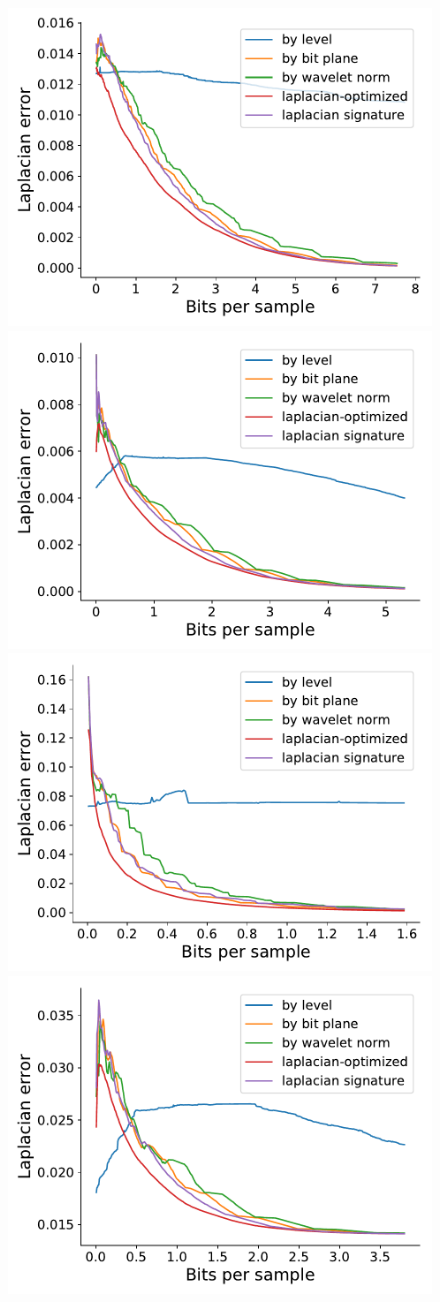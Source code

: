\begin{figure}
	\centering
	{\includegraphics[width=0.48\linewidth]{img/laplacian/laplacian-optimized-boiler.pdf}}
	{\includegraphics[width=0.48\linewidth]{img/laplacian/laplacian-optimized-diffusivity.pdf}}
	{\includegraphics[width=0.48\linewidth]{img/laplacian/laplacian-optimized-euler.pdf}}
	{\includegraphics[width=0.48\linewidth]{img/laplacian/laplacian-optimized-pressure.pdf}}

\end{figure}
